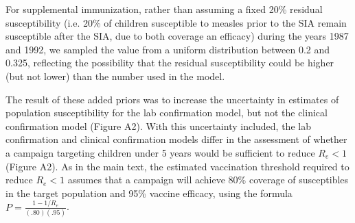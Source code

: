 For supplemental immunization, rather than assuming a fixed 20\% residual susceptibility (i.e. 20\% of children susceptible to measles prior to the SIA remain susceptible after the SIA, due to both coverage an efficacy) during the years 1987 and 1992, we sampled the value from a uniform distribution between 0.2 and 0.325, reflecting the possibility that the residual susceptibility could be higher (but not lower) than the number used in the model.  

The result of these added priors was to increase the uncertainty in estimates of population susceptibility for the lab confirmation model, but not the clinical confirmation model (Figure A2). With this uncertainty included, the lab confirmation and clinical confirmation models differ in the assessment of whether a campaign targeting children under 5 years would be sufficient to reduce $R_e < 1$ (Figure A2). As in the main text, the estimated vaccination threshold required to reduce $R_e < 1$ assumes that a campaign will achieve 80\% coverage of susceptibles in the target population and 95\% vaccine efficacy, using the formula $P = \frac{1-1/R_e}{(.80)(.95)}$. 